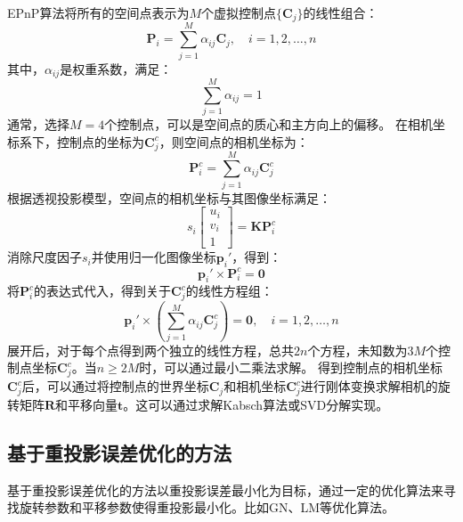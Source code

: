 EPnP算法将所有的空间点表示为$M$个虚拟控制点$\{\mathbf{C}_j\}$的线性组合：
\begin{equation}
	\mathbf{P}_i = \sum_{j=1}^{M} \alpha_{ij} \mathbf{C}_j, \quad i = 1,2,\dots,n
\end{equation}
其中，$\alpha_{ij}$是权重系数，满足：
\begin{equation}
	\sum_{j=1}^{M} \alpha_{ij} = 1
\end{equation}
通常，选择$M=4$个控制点，可以是空间点的质心和主方向上的偏移。
在相机坐标系下，控制点的坐标为$\mathbf{C}_j^{c}$，则空间点的相机坐标为：
\begin{equation}
	\mathbf{P}_i^{c} = \sum_{j=1}^{M} \alpha_{ij} \mathbf{C}_j^{c}
\end{equation}
根据透视投影模型，空间点的相机坐标与其图像坐标满足：
\begin{equation}
	s_i \begin{bmatrix}
		u_i \\ v_i \\ 1
	\end{bmatrix} = \mathbf{K} \mathbf{P}_i^{c}
\end{equation}
消除尺度因子$s_i$并使用归一化图像坐标$\mathbf{p}_i'$，得到：
\begin{equation}
	\mathbf{p}_i' \times \mathbf{P}_i^{c} = \mathbf{0}
\end{equation}
将$\mathbf{P}_i^{c}$的表达式代入，得到关于$\mathbf{C}_j^{c}$的线性方程组：
\begin{equation}
	\mathbf{p}_i' \times \left( \sum_{j=1}^{M} \alpha_{ij} \mathbf{C}_j^{c} \right ) = \mathbf{0}, \quad i = 1,2,\dots,n
\end{equation}
展开后，对于每个点得到两个独立的线性方程，总共$2n$个方程，未知数为$3M$个控制点坐标$\mathbf{C}_j^{c}$。当$n \geq 2M$时，可以通过最小二乘法求解。
得到控制点的相机坐标$\mathbf{C}_j^{c}$后，可以通过将控制点的世界坐标$\mathbf{C}_j$和相机坐标$\mathbf{C}_j^{c}$进行刚体变换求解相机的旋转矩阵$\mathbf{R}$和平移向量$\mathbf{t}$。这可以通过求解Kabsch算法或SVD分解实现。

\subsection{基于重投影误差优化的方法}
基于重投影误差优化的方法以重投影误差最小化为目标，通过一定的优化算法来寻找旋转参数和平移参数使得重投影最小化。比如GN\cite{vcolakovic2022hand, zhu2024lodloc}、LM\cite{xu2022rnnpose}等优化算法。

